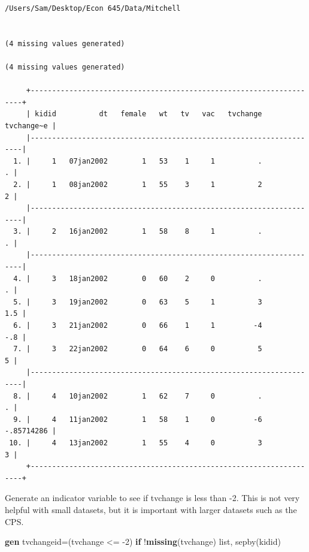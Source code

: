 \documentclass[
]{book}
\newenvironment{Shaded}{\begin{snugshade}}{\end{snugshade}}
\newcommand{\FunctionTok}[1]{\textcolor[rgb]{0.13,0.29,0.53}{\textbf{#1}}}
\newcommand{\KeywordTok}[1]{\textcolor[rgb]{0.13,0.29,0.53}{\textbf{#1}}}
\newcommand{\NormalTok}[1]{#1}
\newcommand{\OtherTok}[1]{\textcolor[rgb]{0.56,0.35,0.01}{#1}}
\begin{document}
\begin{verbatim}
/Users/Sam/Desktop/Econ 645/Data/Mitchell


(4 missing values generated)

(4 missing values generated)

     +--------------------------------------------------------------------+
     | kidid          dt   female   wt   tv   vac   tvchange   tvchange~e |
     |--------------------------------------------------------------------|
  1. |     1   07jan2002        1   53    1     1          .            . |
  2. |     1   08jan2002        1   55    3     1          2            2 |
     |--------------------------------------------------------------------|
  3. |     2   16jan2002        1   58    8     1          .            . |
     |--------------------------------------------------------------------|
  4. |     3   18jan2002        0   60    2     0          .            . |
  5. |     3   19jan2002        0   63    5     1          3          1.5 |
  6. |     3   21jan2002        0   66    1     1         -4          -.8 |
  7. |     3   22jan2002        0   64    6     0          5            5 |
     |--------------------------------------------------------------------|
  8. |     4   10jan2002        1   62    7     0          .            . |
  9. |     4   11jan2002        1   58    1     0         -6   -.85714286 |
 10. |     4   13jan2002        1   55    4     0          3            3 |
     +--------------------------------------------------------------------+
\end{verbatim}

Generate an indicator variable to see if tvchange is less than -2. This is not
very helpful with small datasets, but it is important with larger datasets such as the CPS.

\begin{Shaded}
\begin{Highlighting}[]
\KeywordTok{gen}\NormalTok{ tvchangeid=(tvchange \textless{}= {-}2) }\KeywordTok{if}\NormalTok{ !}\FunctionTok{missing}\NormalTok{(tvchange)}
\OtherTok{list}\NormalTok{, sepby(kidid)}
\end{Highlighting}
\end{Shaded}
\end{document}
